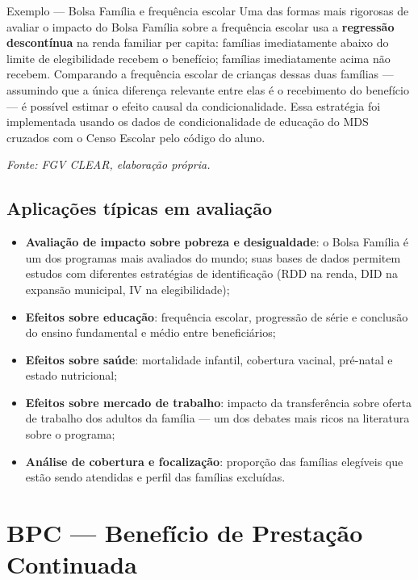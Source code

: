 \begin{boxexemplo}{Exemplo — Bolsa Família e frequência escolar}
Uma das formas mais rigorosas de avaliar o impacto do Bolsa Família sobre a frequência escolar usa a \textbf{regressão descontínua} na renda familiar per capita: famílias imediatamente abaixo do limite de elegibilidade recebem o benefício; famílias imediatamente acima não recebem. Comparando a frequência escolar de crianças dessas duas famílias — assumindo que a única diferença relevante entre elas é o recebimento do benefício — é possível estimar o efeito causal da condicionalidade. Essa estratégia foi implementada usando os dados de condicionalidade de educação do MDS cruzados com o Censo Escolar pelo código do aluno.

\textit{Fonte: FGV CLEAR, elaboração própria.}
\end{boxexemplo}

\subsection{Aplicações típicas em avaliação}

\begin{itemize}
  \item \textbf{Avaliação de impacto sobre pobreza e desigualdade}: o Bolsa Família é um dos programas mais avaliados do mundo; suas bases de dados permitem estudos com diferentes estratégias de identificação (RDD na renda, DID na expansão municipal, IV na elegibilidade);
  \item \textbf{Efeitos sobre educação}: frequência escolar, progressão de série e conclusão do ensino fundamental e médio entre beneficiários;
  \item \textbf{Efeitos sobre saúde}: mortalidade infantil, cobertura vacinal, pré-natal e estado nutricional;
  \item \textbf{Efeitos sobre mercado de trabalho}: impacto da transferência sobre oferta de trabalho dos adultos da família — um dos debates mais ricos na literatura sobre o programa;
  \item \textbf{Análise de cobertura e focalização}: proporção das famílias elegíveis que estão sendo atendidas e perfil das famílias excluídas.
\end{itemize}

\section{BPC — Benefício de Prestação Continuada}

